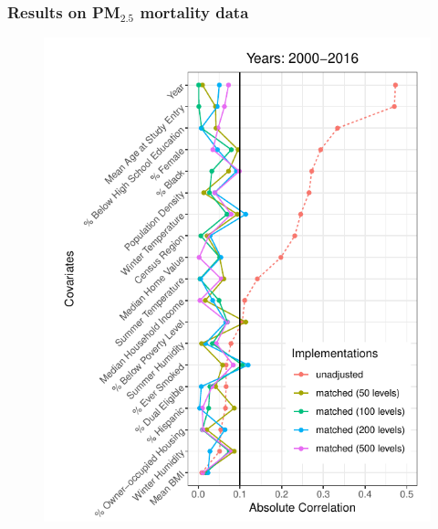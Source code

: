 \begin{frame}
  \frametitle{Results on PM$_\text{2.5}$ mortality data} 
  
  \begin{figure}[ht]
    \centering
    \includegraphics[height=0.8\textheight]{figures/wu-fig2.png}
  \end{figure}

  
\end{frame}


